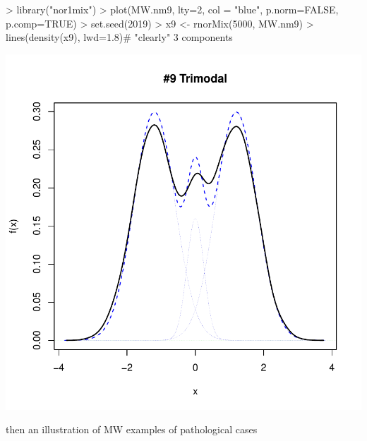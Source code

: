 \begin{Schunk}
\begin{Sinput}
> library("nor1mix")
> plot(MW.nm9, lty=2, col = "blue", p.norm=FALSE, p.comp=TRUE)
> set.seed(2019)
> x9 <- rnorMix(5000, MW.nm9)
> lines(density(x9), lwd=1.8)# "clearly" 3 components
\end{Sinput}
\end{Schunk}
\includegraphics{chapter1-001}


then an illustration of MW examples of pathological cases


